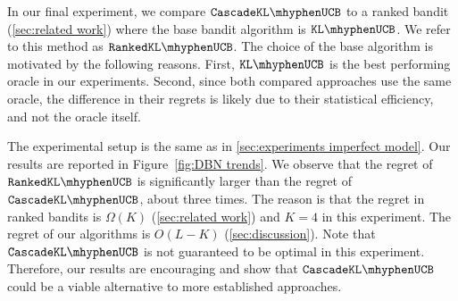 In our final experiment, we compare $\cascadeklucb$ to a ranked bandit (\cref{sec:related work}) where the base bandit algorithm is $\klucb$. We refer to this method as $\rankedklucb$. The choice of the base algorithm is motivated by the following reasons. First, $\klucb$ is the best performing oracle in our experiments. Second, since both compared approaches use the same oracle, the difference in their regrets is likely due to their statistical efficiency, and not the oracle itself.

The experimental setup is the same as in \cref{sec:experiments imperfect model}. Our results are reported in Figure~\ref{fig:DBN trends}. We observe that the regret of $\rankedklucb$ is significantly larger than the regret of $\cascadeklucb$, about three times. The reason is that the regret in ranked bandits is $\Omega(K)$ (\cref{sec:related work}) and $K = 4$ in this experiment. The regret of our algorithms is $O(L - K)$ (\cref{sec:discussion}). Note that $\cascadeklucb$ is not guaranteed to be optimal in this experiment. Therefore, our results are encouraging and show that $\cascadeklucb$ could be a viable alternative to more established approaches.
